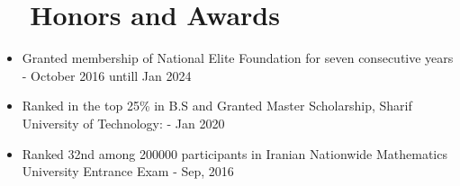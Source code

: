 \documentclass[a4paper,20pt]{article}
\begin{document}
% 

\section{~~Honors and Awards}
\begin{itemize}[nosep, leftmargin=*]
  \item {Granted membership of National Elite Foundation for seven consecutive years - October 2016 untill Jan 2024}
  \item {Ranked in the top 25\% in B.S and Granted Master Scholarship, Sharif University of Technology: - Jan 2020 }
  \item {Ranked 32nd among 200000 participants in Iranian Nationwide Mathematics University Entrance Exam - Sep, 2016}
\end{itemize}
\end{document}
